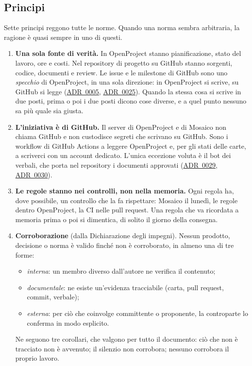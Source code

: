 \documentclass[a4paper, 11pt]{article}
\newcommand{\adr}[1]{\hyperref[adr:#1]{ADR~#1}}
\begin{document}
\subsection{Principi}\label{sec:principi}
Sette principi reggono tutte le norme. Quando una norma sembra arbitraria, la ragione è quasi sempre in uno di questi.
\begin{enumerate}
    \item \textbf{Una sola fonte di verità.} In OpenProject stanno pianificazione, stato del lavoro, ore e costi. Nel repository di progetto su GitHub stanno sorgenti, codice, documenti e review. Le issue e le milestone di GitHub sono uno \emph{specchio} di OpenProject, in una sola direzione: in OpenProject si scrive, su GitHub si legge (\adr{0005}, \adr{0025}). Quando la stessa cosa si scrive in due posti, prima o poi i due posti dicono cose diverse, e a quel punto nessuno sa più quale sia giusta.
    \item \textbf{L'iniziativa è di GitHub.} Il server di OpenProject e di Mosaico non chiama GitHub e non custodisce segreti che scrivano su GitHub. Sono i workflow di GitHub Actions a leggere OpenProject e, per gli stati delle carte, a scriverci con un account dedicato. L'unica eccezione voluta è il bot dei verbali, che porta nel repository i documenti approvati (\adr{0029}, \adr{0030}).
    \item \textbf{Le regole stanno nei controlli, non nella memoria.} Ogni regola ha, dove possibile, un controllo che la fa rispettare: Mosaico il lunedì, le regole dentro OpenProject, la CI nelle pull request. Una regola che va ricordata a memoria prima o poi si dimentica, di solito il giorno della consegna.
    \item \textbf{Corroborazione} (dalla Dichiarazione degli impegni). Nessun prodotto, decisione o norma è valido finché non è corroborato, in almeno una di tre forme:
    \begin{itemize}
        \item \emph{interna}: un membro diverso dall'autore ne verifica il contenuto;
        \item \emph{documentale}: ne esiste un'evidenza tracciabile (carta, pull request, commit, verbale);
        \item \emph{esterna}: per ciò che coinvolge committente o proponente, la controparte lo conferma in modo esplicito.
    \end{itemize}
    Ne seguono tre corollari, che valgono per tutto il documento: ciò che non è tracciato non è avvenuto; il silenzio non corrobora; nessuno corrobora il proprio lavoro.

\end{enumerate}
\end{document}
